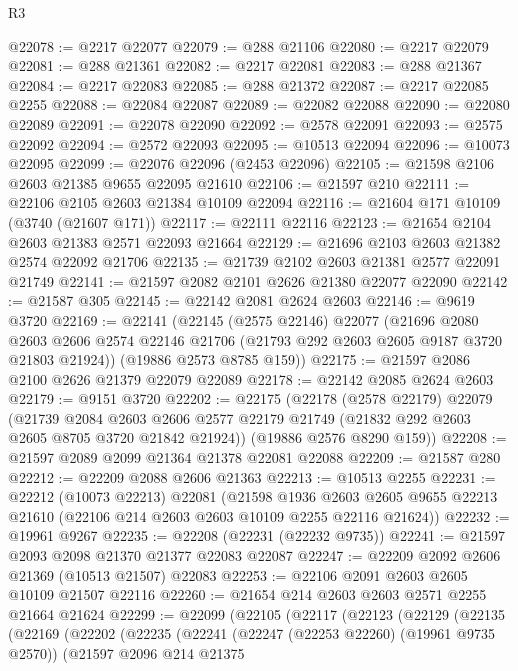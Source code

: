 \begin{lexlean}{R3}
\begin{coremodule}
@22078 := @2217 @22077
@22079 := @288 @21106
@22080 := @2217 @22079
@22081 := @288 @21361
@22082 := @2217 @22081
@22083 := @288 @21367
@22084 := @2217 @22083
@22085 := @288 @21372
@22087 := @2217 @22085 @2255
@22088 := @22084 @22087
@22089 := @22082 @22088
@22090 := @22080 @22089
@22091 := @22078 @22090
@22092 := @2578 @22091
@22093 := @2575 @22092
@22094 := @2572 @22093
@22095 := @10513 @22094
@22096 := @10073 @22095
@22099 := @22076 @22096 (@2453 @22096)
@22105 := @21598 @2106 @2603 @21385 @9655 @22095 @21610
@22106 := @21597 @210
@22111 := @22106 @2105 @2603 @21384 @10109 @22094
@22116 := @21604 @171 @10109 (@3740 (@21607 @171))
@22117 := @22111 @22116
@22123 := @21654 @2104 @2603 @21383 @2571 @22093 @21664
@22129 := @21696 @2103 @2603 @21382 @2574 @22092 @21706
@22135 := @21739 @2102 @2603 @21381 @2577 @22091 @21749
@22141 := @21597 @2082 @2101 @2626 @21380 @22077 @22090
@22142 := @21587 @305
@22145 := @22142 @2081 @2624 @2603
@22146 := @9619 @3720
@22169 := @22141
    (@22145
      (@2575 @22146)
      @22077
      (@21696
        @2080
        @2603
        @2606
        @2574
        @22146
        @21706
        (@21793 @292 @2603 @2605 @9187 @3720 @21803 @21924))
      (@19886 @2573 @8785 @159))
@22175 := @21597 @2086 @2100 @2626 @21379 @22079 @22089
@22178 := @22142 @2085 @2624 @2603
@22179 := @9151 @3720
@22202 := @22175
    (@22178
      (@2578 @22179)
      @22079
      (@21739
        @2084
        @2603
        @2606
        @2577
        @22179
        @21749
        (@21832 @292 @2603 @2605 @8705 @3720 @21842 @21924))
      (@19886 @2576 @8290 @159))
@22208 := @21597 @2089 @2099 @21364 @21378 @22081 @22088
@22209 := @21587 @280
@22212 := @22209 @2088 @2606 @21363
@22213 := @10513 @2255
@22231 := @22212
    (@10073 @22213)
    @22081
    (@21598
      @1936
      @2603
      @2605
      @9655
      @22213
      @21610
      (@22106 @214 @2603 @2603 @10109 @2255 @22116 @21624))
@22232 := @19961 @9267
@22235 := @22208 (@22231 (@22232 @9735))
@22241 := @21597 @2093 @2098 @21370 @21377 @22083 @22087
@22247 := @22209 @2092 @2606 @21369 (@10513 @21507) @22083
@22253 := @22106 @2091 @2603 @2605 @10109 @21507 @22116
@22260 := @21654 @214 @2603 @2603 @2571 @2255 @21664 @21624
@22299 := @22099
    (@22105
      (@22117
        (@22123
          (@22129
            (@22135
              (@22169
                (@22202
                  (@22235
                    (@22241
                      (@22247 (@22253 @22260) (@19961 @9735 @2570))
                      (@21597
                        @2096
                        @214
                        @21375

\end{coremodule}
\end{lexlean}
